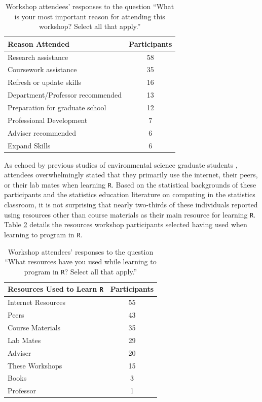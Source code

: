 \documentclass[12pt]{article}
\begin{document}
{
\begin{table}[h!]
    \centering
    \begin{tabular}{lc}
\hline
Reason Attended & Participants \\
\hline
Research assistance &  58 \\
Coursework assistance &  35 \\
Refresh or update skills &  16 \\
Department/Professor recommended &  13 \\
Preparation for graduate school &  12 \\
Professional Development &   7 \\
Adviser recommended &   6 \\
Expand Skills & 6 \\
\hline
\end{tabular}
\caption{Workshop attendees' responses to the question ``What is your most important reason for attending this workshop? Select all that apply.''}
    \label{tab:reasons}
\end{table}
}

\quad As echoed by previous studies of environmental science graduate students \citep{datacarpentry, theobold}, attendees overwhelmingly stated that they primarily use the internet, their peers, or their lab mates when learning \texttt{R}. Based on the statistical backgrounds of these participants and the statistics education literature on computing in the statistics classroom, it is not surprising that nearly two-thirds of these individuals reported using resources other than course materials as their main resource for learning \texttt{R}. Table \ref{tab:resources} details the resources workshop participants selected having used when learning to program in \texttt{R}. 

{
\begin{table}[h!]
    \centering
    \begin{tabular}{lc}
\hline
Resources Used to Learn \texttt{R} & Participants \\
\hline
Internet Resources & 55 \\
Peers & 43 \\
Course Materials & 35 \\
Lab Mates & 29  \\
Adviser	& 20 \\
These Workshops & 15 \\
Books & 3 \\
Professor & 1 \\
\hline
\end{tabular}
\caption{Workshop attendees' responses to the question ``What resources have you used while learning to program in \texttt{R}? Select all that apply.''}
    \label{tab:resources}
\end{table}
}
\end{document}
